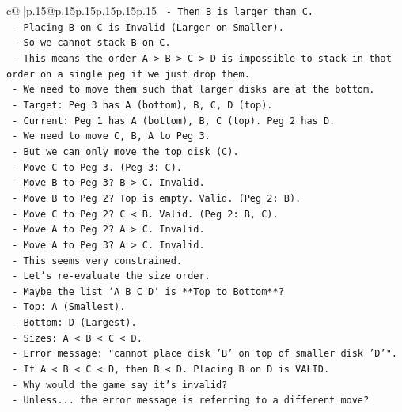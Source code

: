 \documentclass{article}
\begin{document}
{\begin{supertabular}{c@{$\;$}|p{.15\linewidth}@{}p{.15\linewidth}p{.15\linewidth}p{.15\linewidth}p{.15\linewidth}p{.15\linewidth}}
{{{\texttt{          {-} Then B is larger than C.} \\
\texttt{          {-} Placing B on C is Invalid (Larger on Smaller).} \\
\texttt{          {-} So we cannot stack B on C.} \\
\texttt{          {-} This means the order A > B > C > D is impossible to stack in that order on a single peg if we just drop them.} \\
\texttt{          {-} We need to move them such that larger disks are at the bottom.} \\
\texttt{          {-} Target: Peg 3 has A (bottom), B, C, D (top).} \\
\texttt{          {-} Current: Peg 1 has A (bottom), B, C (top). Peg 2 has D.} \\
\texttt{          {-} We need to move C, B, A to Peg 3.} \\
\texttt{          {-} But we can only move the top disk (C).} \\
\texttt{          {-} Move C to Peg 3. (Peg 3: C).} \\
\texttt{          {-} Move B to Peg 3? B > C. Invalid.} \\
\texttt{          {-} Move B to Peg 2? Top is empty. Valid. (Peg 2: B).} \\
\texttt{          {-} Move C to Peg 2? C < B. Valid. (Peg 2: B, C).} \\
\texttt{          {-} Move A to Peg 2? A > C. Invalid.} \\
\texttt{          {-} Move A to Peg 3? A > C. Invalid.} \\
\texttt{          {-} This seems very constrained.} \\
\texttt{          {-} Let's re{-}evaluate the size order.} \\
\texttt{          {-} Maybe the list `A B C D` is **Top to Bottom**?} \\
\texttt{            {-} Top: A (Smallest).} \\
\texttt{            {-} Bottom: D (Largest).} \\
\texttt{            {-} Sizes: A < B < C < D.} \\
\texttt{            {-} Error message: "cannot place disk 'B' on top of smaller disk 'D'".} \\
\texttt{            {-} If A < B < C < D, then B < D. Placing B on D is VALID.} \\
\texttt{            {-} Why would the game say it's invalid?} \\
\texttt{            {-} Unless... the error message is referring to a different move?} \\
}}}
\end{supertabular}}
\end{document}
